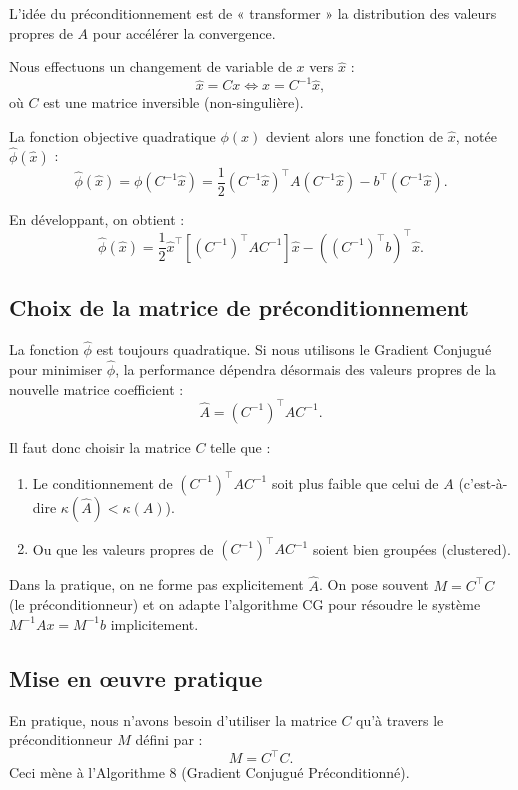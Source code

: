 L'idée du préconditionnement est de « transformer » la distribution des valeurs propres de $A$ pour accélérer la convergence.

Nous effectuons un changement de variable de $x$ vers $\hat{x}$ :
\[
\hat{x} = C x \iff x = C^{-1} \hat{x},
\]
où $C$ est une matrice inversible (non-singulière).

La fonction objective quadratique $\phi(x)$ devient alors une fonction de $\hat{x}$, notée $\hat{\phi}(\hat{x})$ :
\[
\hat{\phi}(\hat{x}) = \phi(C^{-1}\hat{x}) = \frac{1}{2} (C^{-1}\hat{x})^\top A (C^{-1}\hat{x}) - b^\top (C^{-1}\hat{x}).
\]

En développant, on obtient :
\[
\hat{\phi}(\hat{x}) = \frac{1}{2} \hat{x}^\top \left[ (C^{-1})^\top A C^{-1} \right] \hat{x} - \left( (C^{-1})^\top b \right)^\top \hat{x}.
\]

\subsection{Choix de la matrice de préconditionnement}

La fonction $\hat{\phi}$ est toujours quadratique. Si nous utilisons le Gradient Conjugué pour minimiser $\hat{\phi}$, la performance dépendra désormais des valeurs propres de la nouvelle matrice coefficient :
\[
\hat{A} = (C^{-1})^\top A C^{-1}.
\]

Il faut donc choisir la matrice $C$ telle que :
\begin{enumerate}
    \item Le conditionnement de $(C^{-1})^\top A C^{-1}$ soit plus faible que celui de $A$ (c'est-à-dire $\kappa(\hat{A}) < \kappa(A)$).
    \item Ou que les valeurs propres de $(C^{-1})^\top A C^{-1}$ soient bien groupées (clustered).
\end{enumerate}

Dans la pratique, on ne forme pas explicitement $\hat{A}$. On pose souvent $M = C^\top C$ (le préconditionneur) et on adapte l'algorithme CG pour résoudre le système $M^{-1} A x = M^{-1} b$ implicitement.

\subsection{Mise en œuvre pratique}

En pratique, nous n'avons besoin d'utiliser la matrice $C$ qu'à travers le préconditionneur $M$ défini par :
\[
M = C^\top C.
\]
Ceci mène à l'Algorithme 8 (Gradient Conjugué Préconditionné).

